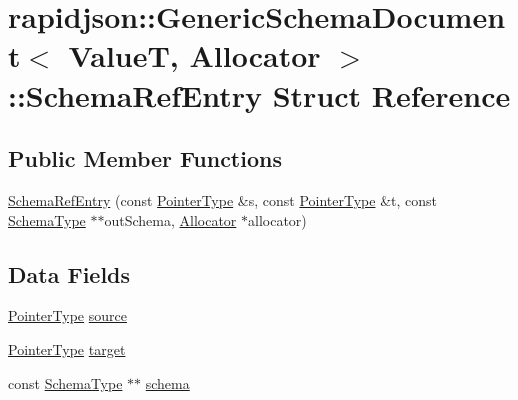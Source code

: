 \hypertarget{structrapidjson_1_1_generic_schema_document_1_1_schema_ref_entry}{}\section{rapidjson\+::Generic\+Schema\+Document$<$ ValueT, Allocator $>$\+::Schema\+Ref\+Entry Struct Reference}
\label{structrapidjson_1_1_generic_schema_document_1_1_schema_ref_entry}
\subsection*{Public Member Functions}
\begin{DoxyCompactItemize}
\item 
\mbox{\hyperlink{structrapidjson_1_1_generic_schema_document_1_1_schema_ref_entry_a47bc798a3df32a81ee18ca996a989c84}{Schema\+Ref\+Entry}} (const \mbox{\hyperlink{classrapidjson_1_1_generic_schema_document_a61540c0f8aa542760ae03257a0e6dab7}{Pointer\+Type}} \&s, const \mbox{\hyperlink{classrapidjson_1_1_generic_schema_document_a61540c0f8aa542760ae03257a0e6dab7}{Pointer\+Type}} \&t, const \mbox{\hyperlink{classrapidjson_1_1_generic_schema_document_aaf4e7f371de938025f7ed4be3b83266e}{Schema\+Type}} $\ast$$\ast$out\+Schema, \mbox{\hyperlink{classrapidjson_1_1_allocator}{Allocator}} $\ast$allocator)
\end{DoxyCompactItemize}
\subsection*{Data Fields}
\begin{DoxyCompactItemize}
\item 
\mbox{\hyperlink{classrapidjson_1_1_generic_schema_document_a61540c0f8aa542760ae03257a0e6dab7}{Pointer\+Type}} \mbox{\hyperlink{structrapidjson_1_1_generic_schema_document_1_1_schema_ref_entry_a076b8a79bc1771d0fb56523e00bffca8}{source}}
\item 
\mbox{\hyperlink{classrapidjson_1_1_generic_schema_document_a61540c0f8aa542760ae03257a0e6dab7}{Pointer\+Type}} \mbox{\hyperlink{structrapidjson_1_1_generic_schema_document_1_1_schema_ref_entry_a00f62e3429eb937487a4d8c499cbe11e}{target}}
\item 
const \mbox{\hyperlink{classrapidjson_1_1_generic_schema_document_aaf4e7f371de938025f7ed4be3b83266e}{Schema\+Type}} $\ast$$\ast$ \mbox{\hyperlink{structrapidjson_1_1_generic_schema_document_1_1_schema_ref_entry_afae4d25dcd446a5fc88ba5797a66aa9b}{schema}}
\end{DoxyCompactItemize}


